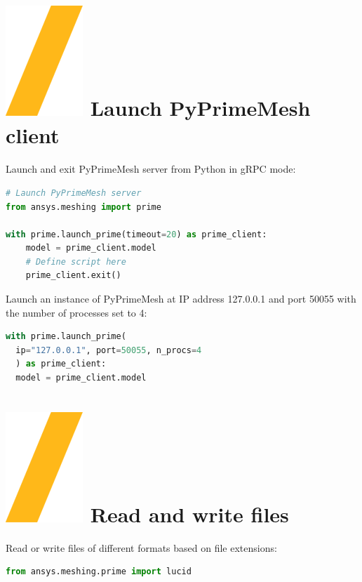 \documentclass[9pt,landscape]{article}
\begin{document}
\begin{multicols}{3}
\setlength{\premulticols}{1pt}
\setlength{\postmulticols}{1pt}
\setlength{\multicolsep}{1pt}
\setlength{\columnsep}{2pt}

\vfill
\section{\includegraphics[height=\fontcharht\font`\S]{slash.png} Launch PyPrimeMesh client}
Launch and exit PyPrimeMesh server from Python in gRPC mode:\\
\begin{lstlisting}[language=Python]
# Launch PyPrimeMesh server 
from ansys.meshing import prime

with prime.launch_prime(timeout=20) as prime_client:
    model = prime_client.model
    # Define script here
    prime_client.exit()
\end{lstlisting}

Launch an instance of PyPrimeMesh at IP address
127.0.0.1 and port 50055 with the number of processes set to 4:
\begin{lstlisting}[language=Python]
with prime.launch_prime(
  ip="127.0.0.1", port=50055, n_procs=4
  ) as prime_client:
  model = prime_client.model
\end{lstlisting}

\section{\includegraphics[height=\fontcharht\font`\S]{slash.png} Read and write files}
Read or write files of different formats based on file extensions:\\
\begin{lstlisting}[language=Python]
from ansys.meshing.prime import lucid


\end{lstlisting}
\end{multicols}
\end{document}
